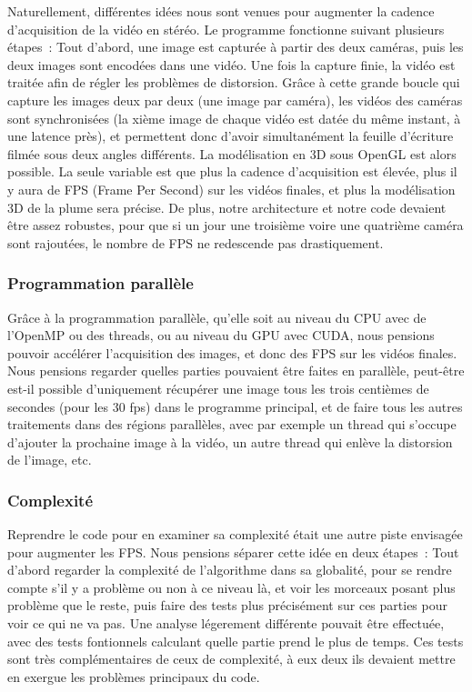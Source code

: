 Naturellement, différentes idées nous sont venues pour augmenter la cadence d'acquisition de la vidéo en stéréo. Le programme fonctionne suivant plusieurs étapes~: Tout d'abord, une image est capturée à partir des deux caméras, puis les deux images sont encodées dans une vidéo. Une fois la capture finie, la vidéo est traitée afin de régler les problèmes de distorsion. Grâce à cette grande boucle qui capture les images deux par deux (une image par caméra), les vidéos des caméras sont synchronisées (la xième image de chaque vidéo est datée du même instant, à une latence près), et permettent donc d'avoir simultanément la feuille d'écriture filmée sous deux angles différents. La modélisation en 3D sous OpenGL est alors possible. La seule variable est que plus la cadence d'acquisition est élevée, plus il y aura de FPS (Frame Per Second) sur les vidéos finales, et plus la modélisation 3D de la plume sera précise. De plus, notre architecture et notre code devaient être assez robustes, pour que si un jour une troisième voire une quatrième caméra sont rajoutées, le nombre de FPS ne redescende pas drastiquement.

\subsubsection{Programmation parallèle}

Grâce à la programmation parallèle, qu'elle soit au niveau du CPU avec de l'OpenMP ou des threads, ou au niveau du GPU avec CUDA, nous pensions pouvoir accélérer l'acquisition des images, et donc des FPS sur les vidéos finales. Nous pensions regarder quelles parties pouvaient être faites en parallèle, peut-être est-il possible d'uniquement récupérer une image tous les trois centièmes de secondes (pour les 30 fps) dans le programme principal, et de faire tous les autres traitements dans des régions parallèles, avec par exemple un thread qui s'occupe d'ajouter la prochaine image à la vidéo, un autre thread qui enlève la distorsion de l'image, etc.

\subsubsection{Complexité}

Reprendre le code pour en examiner sa complexité était une autre piste envisagée pour augmenter les FPS. Nous pensions séparer cette idée en deux étapes~: Tout d'abord regarder la complexité de l'algorithme dans sa globalité, pour se rendre compte s'il y a problème ou non à ce niveau là, et voir les morceaux posant plus problème que le reste, puis faire des tests plus précisément sur ces parties pour voir ce qui ne va pas. Une analyse légerement différente pouvait être effectuée, avec des tests fontionnels calculant quelle partie prend le plus de temps. Ces tests sont très complémentaires de ceux de complexité, à eux deux ils devaient mettre en exergue les problèmes principaux du code.

